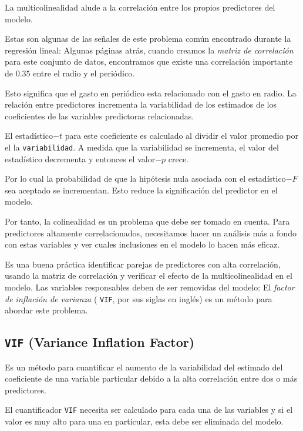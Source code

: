 La multicolinealidad alude a la correlación entre los propios predictores del modelo.


Estas son algunas de las señales de este problema común encontrado durante la regresión lineal:  Algunas páginas atrás, cuando creamos la \emph{matriz de correlación} para este conjunto de datos, encontramos que existe una correlación importante de $0.35$ entre el radio y el periódico.

Esto significa que el gasto en periódico esta relacionado con el gasto en radio. La relación entre predictores incrementa la variabilidad de los estimados de los coeficientes de las variables predictoras relacionadas.


El estadístico$-t$ para este coeficiente es calculado al dividir el valor promedio por el la \texttt{variabilidad}.  A medida que la variabilidad se incrementa, el valor del estadístico decrementa y entonces el valor$-p$ crece. 

Por lo cual la probabilidad de que la hipótesis nula asociada con el estadístico$-F$ sea aceptado se incrementan. Esto reduce la significación del predictor en el modelo.


Por tanto, la colinealidad es un problema que debe ser tomado en cuenta.  Para predictores altamente correlacionados, necesitamos hacer un análisis más a fondo con estas variables y ver cuales inclusiones en el modelo lo hacen más eficaz.


Es una buena práctica identificar parejas de predictores con alta correlación, usando la matriz de correlación y verificar el efecto de la multicolinealidad en el modelo.  Las variables responsables deben de ser removidas del modelo: El \emph{factor de inflación de varianza} ( \texttt{VIF}, por sus siglas en inglés) es un método para abordar este problema.

\subsection{\texttt{VIF} (Variance Inflation Factor)}
Es un método para cuantificar el aumento de la variabilidad del estimado del coeficiente de una variable particular debido a la alta correlación entre dos o más predictores.


El cuantificador \texttt{VIF} necesita ser calculado para cada una de las variables y si el valor es muy alto para una en particular, esta debe ser eliminada del modelo.

